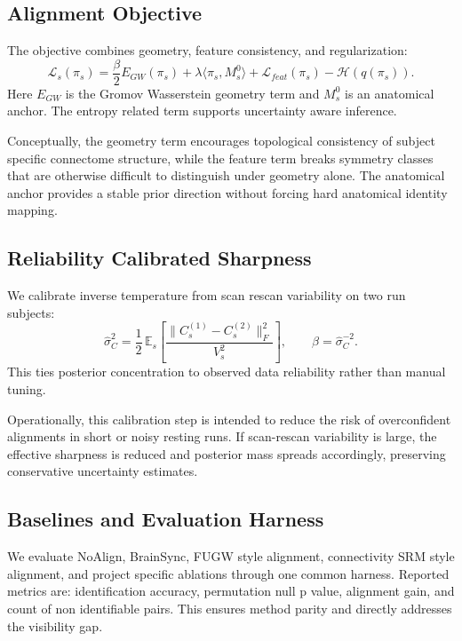 \documentclass[conference]{IEEEtran}
\begin{document}
\subsection{Alignment Objective}
The objective combines geometry, feature consistency, and regularization:
\begin{equation}
\mathcal{L}_s(\pi_s)=\frac{\beta}{2}E_{GW}(\pi_s)+\lambda\langle\pi_s,M_s^0\rangle+\mathcal{L}_{feat}(\pi_s)-\mathcal{H}(q(\pi_s)).
\end{equation}
Here $E_{GW}$ is the Gromov Wasserstein geometry term and $M_s^0$ is an anatomical anchor. The entropy related term supports uncertainty aware inference.

Conceptually, the geometry term encourages topological consistency of subject specific connectome structure, while the feature term breaks symmetry classes that are otherwise difficult to distinguish under geometry alone. The anatomical anchor provides a stable prior direction without forcing hard anatomical identity mapping.

\subsection{Reliability Calibrated Sharpness}
We calibrate inverse temperature from scan rescan variability on two run subjects:
\begin{equation}
\hat{\sigma}_C^2=\frac{1}{2}\,\mathbb{E}_s\left[\frac{\|C_s^{(1)}-C_s^{(2)}\|_F^2}{V_s^2}\right],
\qquad
\beta=\hat{\sigma}_C^{-2}.
\end{equation}
This ties posterior concentration to observed data reliability rather than manual tuning.

Operationally, this calibration step is intended to reduce the risk of overconfident alignments in short or noisy resting runs. If scan-rescan variability is large, the effective sharpness is reduced and posterior mass spreads accordingly, preserving conservative uncertainty estimates.

\subsection{Baselines and Evaluation Harness}
We evaluate NoAlign, BrainSync, FUGW style alignment, connectivity SRM style alignment, and project specific ablations through one common harness. Reported metrics are: identification accuracy, permutation null p value, alignment gain, and count of non identifiable pairs. This ensures method parity and directly addresses the visibility gap.
\end{document}
